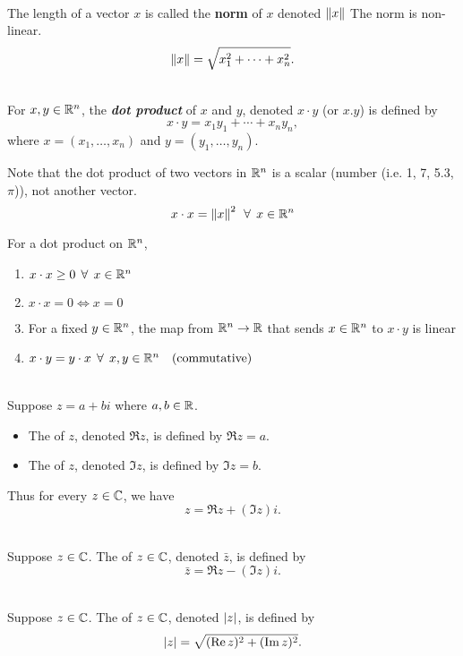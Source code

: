 \\The length of a vector $x$ is called the \textbf{norm} of $x$ denoted $\left\| {x} \right\|$ The norm is non-linear. 
$$\left\| {x} \right\| = \sqrt{x_1^2 + \cdots + x_n^2}.$$


 \\ For $x,y \in \mathbb{R}^n$, the \textbf{\textit{dot product}} of $x$ and $y$, denoted $x \cdot y$ (or $x.y$) is defined by
$$x \cdot y = x_1y_1 + \cdots + x_ny_n,$$
where $x = (x_1, \dots , x_n)$ and $y = (y_1, \dots , y_n)$.

\nl Note that the dot product of two vectors in $\mathbb{R}^n$ is a scalar (number (i.e. 1, 7, 5.3, $\pi$)), not another vector.
$$x \cdot x = \left\| {x} \right\|^2 \;\, \forall \;\, x \in \mathbb{R}^n$$

 For a dot product on $\mathbb{R}^n$,
\begin{enumerate}[label=(\alph*)]
    \item $x \cdot x \geq 0 \;\, \forall \;\, x \in \mathbb{R}^n$
    \item $x \cdot x = 0 \iff x = 0$
    \item For a fixed $y \in \mathbb{R}^n$, the map from $\mathbb{R}^n \to \mathbb{R}$ that sends $x \in \mathbb{R}^n$ to $x \cdot y$ is linear
    \item $x \cdot y = y \cdot x \;\, \forall \;\, x,y \in \mathbb{R}^n \quad \text{(commutative)}$
\end{enumerate}

\\Suppose $z = a + bi$ where $a, b \in \mathbb{R}$.
\begin{itemize}
    \item The  of $z$, denoted $\Re z$, is defined by $\Re z = a$.
    \item The  of $z$, denoted $\Im z$, is defined by $\Im z = b$.
\end{itemize}

\nl Thus for every $z \in \mathbb{C}$, we have
$$z = \Re z + (\Im z) i.$$

\\Suppose $z \in \mathbb{C}$. The  of $z \in \mathbb{C}$, denoted $\bar{z}$, is defined by
$$\bar{z} = \Re z - (\Im z)i.$$

\\Suppose $z \in \mathbb{C}$. The  of $z \in \mathbb{C}$, denoted $\left| {z} \right|$, is defined by $$\left| {z} \right| = \sqrt{(\operatorname{Re} z)^2 + (\operatorname{Im} z)^2}.$$

